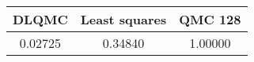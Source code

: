 \begin{tabular}{|c|c|c|}
\hline
DLQMC&Least squares&QMC 128\\ 
\hline

0.02725 & 0.34840 & 1.00000\\ 
\hline
\end{tabular}

